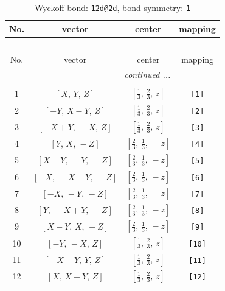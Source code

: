 \documentclass[fleqn,8pt]{jsarticle}
\begin{document}
\begin{longtable}{cccc}
\caption{Wyckoff bond: {\tt 12d@2d}, bond symmetry: {\tt 1}}
 \\
 \hline \hline
No. & vector & center & mapping \\ \hline \endfirsthead

\multicolumn{3}{l}{\tablename\ \thetable{}} \\
 \hline \hline
No. & vector & center & mapping \\ \hline \endhead

 \hline \hline
\multicolumn{3}{r}{\footnotesize\it continued ...} \\ \endfoot

 \hline \hline
\multicolumn{3}{r}{} \\ \endlastfoot

1 & $\left[ X,\, Y,\, Z \right]$ & $\left[ \frac{1}{3},\, \frac{2}{3},\, z \right]$ & {\tt [1]} \\ \hline
2 & $\left[ - Y,\, X - Y,\, Z \right]$ & $\left[ \frac{1}{3},\, \frac{2}{3},\, z \right]$ & {\tt [2]} \\ \hline
3 & $\left[ - X + Y,\, - X,\, Z \right]$ & $\left[ \frac{1}{3},\, \frac{2}{3},\, z \right]$ & {\tt [3]} \\ \hline
4 & $\left[ Y,\, X,\, - Z \right]$ & $\left[ \frac{2}{3},\, \frac{1}{3},\, - z \right]$ & {\tt [4]} \\ \hline
5 & $\left[ X - Y,\, - Y,\, - Z \right]$ & $\left[ \frac{2}{3},\, \frac{1}{3},\, - z \right]$ & {\tt [5]} \\ \hline
6 & $\left[ - X,\, - X + Y,\, - Z \right]$ & $\left[ \frac{2}{3},\, \frac{1}{3},\, - z \right]$ & {\tt [6]} \\ \hline
7 & $\left[ - X,\, - Y,\, - Z \right]$ & $\left[ \frac{2}{3},\, \frac{1}{3},\, - z \right]$ & {\tt [7]} \\ \hline
8 & $\left[ Y,\, - X + Y,\, - Z \right]$ & $\left[ \frac{2}{3},\, \frac{1}{3},\, - z \right]$ & {\tt [8]} \\ \hline
9 & $\left[ X - Y,\, X,\, - Z \right]$ & $\left[ \frac{2}{3},\, \frac{1}{3},\, - z \right]$ & {\tt [9]} \\ \hline
10 & $\left[ - Y,\, - X,\, Z \right]$ & $\left[ \frac{1}{3},\, \frac{2}{3},\, z \right]$ & {\tt [10]} \\ \hline
11 & $\left[ - X + Y,\, Y,\, Z \right]$ & $\left[ \frac{1}{3},\, \frac{2}{3},\, z \right]$ & {\tt [11]} \\ \hline
12 & $\left[ X,\, X - Y,\, Z \right]$ & $\left[ \frac{1}{3},\, \frac{2}{3},\, z \right]$ & {\tt [12]} \\
\end{longtable}
\end{document}
